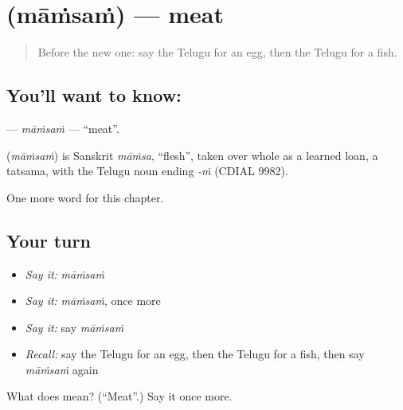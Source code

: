 \section[\texorpdfstring{\te{మాంసం} (māṁsaṁ)}{మాంసం (māṁsaṁ)}]{ (māṁsaṁ) — meat}

\label{lesson:TE-C116-mamsam}



\begin{quote}
Before the new one: say the Telugu for an egg, then the Telugu for a fish.
\end{quote}

\subsection*{You'll want to know: }
\textbf{} — \emph{māṁsaṁ} — \textquotedblleft{}meat\textquotedblright{}.

\begin{cousinweb}
\textbf{} (\emph{māṁsaṁ}) is Sanskrit \emph{māṁsa}, \textquotedblleft{}flesh\textquotedblright{}, taken over whole as a learned loan, a tatsama, with the Telugu noun ending \emph{-ṁ} (CDIAL 9982).
\end{cousinweb}

\begin{grammarlens}[title={What you've built}]
One more word for this chapter.
\end{grammarlens}

\subsection*{Your turn}
\begin{itemize}
\raggedright
  \item \emph{Say it:} \emph{māṁsaṁ}
  \item \emph{Say it:} \emph{māṁsaṁ}, once more
  \item \emph{Say it:} say \emph{māṁsaṁ}
  \item \emph{Recall:} say the Telugu for an egg, then the Telugu for a fish, then say \emph{māṁsaṁ} again
\end{itemize}

\begin{tcolorbox}[breakable,colback=teal!4,colframe=teal!35!black,title={Before you move on}]
What does  mean? (\textquotedblleft{}Meat\textquotedblright{}.) Say it once more.
\end{tcolorbox}
